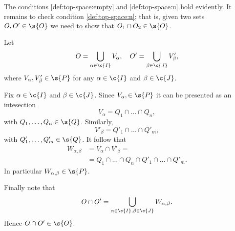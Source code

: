 The conditions \ref{def:top-space:empty} and \ref{def:top-space:u} hold evidently.
It remains to check condition \ref{def:top-space:n};
that is, given two sets $O,O'\in\s{O}$ we need to show that $O_1\cap O_2\in \s{O}$.

Let
\[O=\bigcup_{\alpha\in \c{I}}V_\alpha,\quad O'=\bigcup_{\beta\in \c{J}}V'_\beta,\]
where  $V_\alpha,V'_\beta\in\s{P}$ for any $\alpha\in\c{I}$ and $\beta\in\c{J}$.

Fix $\alpha\in\c{I}$ and $\beta\in\c{J}$.
Since $V_\alpha,\in\s{P}$ it can be presented as an intesection
\[V_\alpha=Q_1\cap \dots \cap Q_n,\]
with $Q_1,\dots,Q_n\in \s{Q}$.
Similarly, 
\[V'_\beta=Q'_1\cap \dots \cap Q'_m,\]
with $Q'_1,\dots,Q'_m\in \s{Q}$.
It follow that 
\begin{align*}
W_{\alpha,\beta}&=V_\alpha\cap V'_\beta=
\\
&=Q_1\cap \dots \cap Q_n\cap Q'_1\cap \dots \cap Q'_m.
\end{align*}
In particular $W_{\alpha,\beta}\in \s{P}$.

Finally note that
\[O\cap O'=\bigcup_{\alpha\in \c{I},\beta\in\c{J}}W_{\alpha,\beta}.\]
Hence $O\cap O'\in \s{O}$.
\qeds
